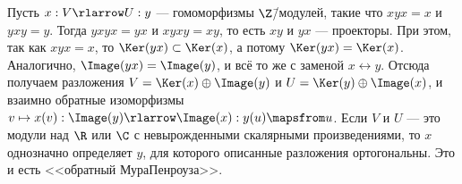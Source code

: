 \documentclass[
	extrafontsizes,
	11pt,
	hyphens,
]{memoir}
\begin{document}
\begin{observation}
Пусть \(x : V \rlarrow U : y\) --- гомоморфизмы \(\Z\)\=/модулей, такие что \(xyx=x\) и \(yxy=y\).
Тогда \(yxyx=yx\) и \(xyxy=xy\), то есть \(xy\) и \(yx\) --- проекторы.
При этом, так как \(xyx=x\), то \(\Ker(yx) \subset \Ker(x)\), а потому \(\Ker(yx) = \Ker(x)\).
Аналогично, \(\Image(yx) = \Image(y)\), и всё то же с заменой \(x \leftrightarrow y\).
Отсюда получаем разложения \(V = \Ker(x) \oplus \Image(y)\) и \(U = \Ker(y) \oplus \Image(x)\),
и взаимно обратные изоморфизмы
\(v \mapsto x(v) : \Image(y) \rlarrow \Image(x) : y(u) \mapsfrom u\).
Если \(V\) и \(U\) --- это модули над \(\R\) или \(\C\) с невырожденными скалярными произведениями, то \(x\) однозначно определяет \(y\), для которого описанные разложения ортогональны. Это и есть <<обратный Мура\namedash{}Пенроуза>>.
\end{observation}





















\backmatter



\makeatletter
\renewcommand*{\toclevel@chapter}{-1}
\makeatother


\listoffigures


\printbibliography
\end{document}
